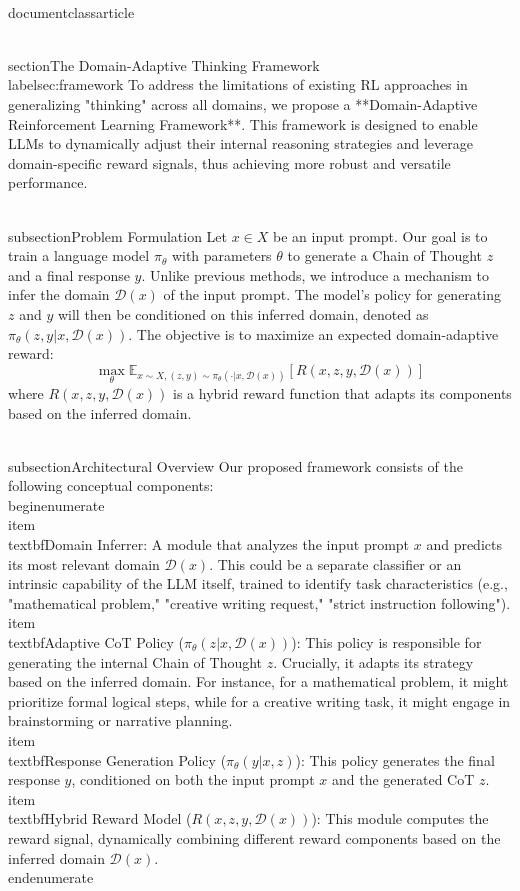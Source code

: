 \\documentclass{article}
\begin{document}
\\section{The Domain-Adaptive Thinking Framework}
\\label{sec:framework}
To address the limitations of existing RL approaches in generalizing "thinking" across all domains, we propose a **Domain-Adaptive Reinforcement Learning Framework**. This framework is designed to enable LLMs to dynamically adjust their internal reasoning strategies and leverage domain-specific reward signals, thus achieving more robust and versatile performance.

\\subsection{Problem Formulation}
Let $x \in X$ be an input prompt. Our goal is to train a language model $\pi_\theta$ with parameters $\theta$ to generate a Chain of Thought $z$ and a final response $y$. Unlike previous methods, we introduce a mechanism to infer the domain $\mathcal{D}(x)$ of the input prompt. The model's policy for generating $z$ and $y$ will then be conditioned on this inferred domain, denoted as $\pi_\theta(z, y | x, \mathcal{D}(x))$. The objective is to maximize an expected domain-adaptive reward:
$$ \max_{\theta} \mathbb{E}_{x \sim X, (z, y) \sim \pi_\theta(\cdot|x, \mathcal{D}(x))} \left[ R(x, z, y, \mathcal{D}(x)) \right] $$
where $R(x, z, y, \mathcal{D}(x))$ is a hybrid reward function that adapts its components based on the inferred domain.

\\subsection{Architectural Overview}
Our proposed framework consists of the following conceptual components:
\\begin{enumerate}
    \\item \\textbf{Domain Inferrer:} A module that analyzes the input prompt $x$ and predicts its most relevant domain $\mathcal{D}(x)$. This could be a separate classifier or an intrinsic capability of the LLM itself, trained to identify task characteristics (e.g., "mathematical problem," "creative writing request," "strict instruction following").
    \\item \\textbf{Adaptive CoT Policy ($\pi_\theta(z|x, \mathcal{D}(x))$):} This policy is responsible for generating the internal Chain of Thought $z$. Crucially, it adapts its strategy based on the inferred domain. For instance, for a mathematical problem, it might prioritize formal logical steps, while for a creative writing task, it might engage in brainstorming or narrative planning.
    \\item \\textbf{Response Generation Policy ($\pi_\theta(y|x, z)$):} This policy generates the final response $y$, conditioned on both the input prompt $x$ and the generated CoT $z$.
    \\item \\textbf{Hybrid Reward Model ($R(x, z, y, \mathcal{D}(x))$):} This module computes the reward signal, dynamically combining different reward components based on the inferred domain $\mathcal{D}(x)$.
\\end{enumerate}
\end{document}
